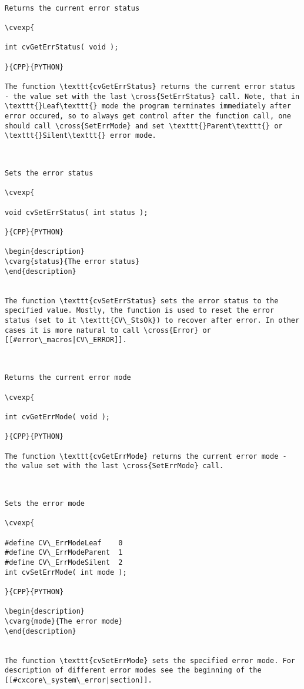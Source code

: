 \begin{verbatim}

Returns the current error status

\cvexp{

int cvGetErrStatus( void );

}{CPP}{PYTHON}

The function \texttt{cvGetErrStatus} returns the current error status - the value set with the last \cross{SetErrStatus} call. Note, that in \texttt{}Leaf\texttt{} mode the program terminates immediately after error occured, so to always get control after the function call, one should call \cross{SetErrMode} and set \texttt{}Parent\texttt{} or \texttt{}Silent\texttt{} error mode.


\end{verbatim}
\begin{verbatim}

Sets the error status

\cvexp{

void cvSetErrStatus( int status );

}{CPP}{PYTHON}

\begin{description}
\cvarg{status}{The error status}
\end{description}


The function \texttt{cvSetErrStatus} sets the error status to the specified value. Mostly, the function is used to reset the error status (set to it \texttt{CV\_StsOk}) to recover after error. In other cases it is more natural to call \cross{Error} or [[#error\_macros|CV\_ERROR]].


\end{verbatim}
\begin{verbatim}

Returns the current error mode

\cvexp{

int cvGetErrMode( void );

}{CPP}{PYTHON}

The function \texttt{cvGetErrMode} returns the current error mode - the value set with the last \cross{SetErrMode} call.


\end{verbatim}
\begin{verbatim}

Sets the error mode

\cvexp{

#define CV\_ErrModeLeaf    0
#define CV\_ErrModeParent  1
#define CV\_ErrModeSilent  2
int cvSetErrMode( int mode );

}{CPP}{PYTHON}

\begin{description}
\cvarg{mode}{The error mode}
\end{description}


The function \texttt{cvSetErrMode} sets the specified error mode. For description of different error modes see the beginning of the [[#cxcore\_system\_error|section]].


\end{verbatim}
